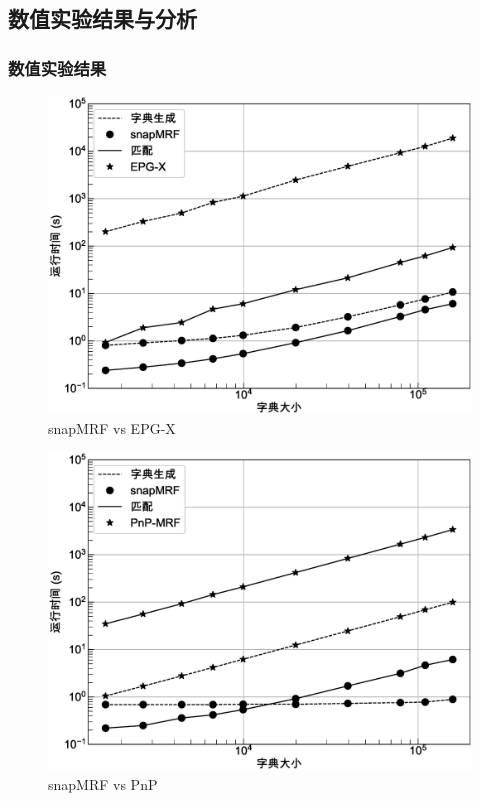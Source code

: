 \documentclass{beamer}
\begin{document}
\subsection{数值实验结果与分析}
\begin{frame}
	\frametitle{数值实验结果}
		\begin{figure}[htbp]
\begin{minipage}[t]{0.45\textwidth}
\centering
\includegraphics[width=1.1\textwidth]{../img/snapmrf/time_vs_epgx.eps}
\\ snapMRF vs EPG-X
\end{minipage}
\hspace{0.5cm}
\begin{minipage}[t]{0.45\textwidth}
\centering
\includegraphics[width=1.1\textwidth]{../img/snapmrf/time_vs_pnp.eps}
\\ snapMRF vs PnP
\end{minipage}
\end{figure}
\end{frame}
\end{document}
